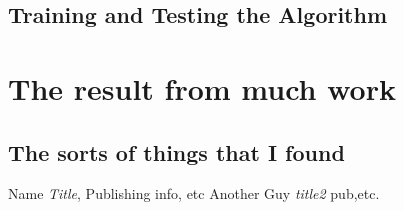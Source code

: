 \documentclass[a4paper,12pt]{report}
\begin{document}
\section{Training and Testing the Algorithm}











\chapter{The result from much work}
\section{The sorts of things that I found}













\begin{thebibliography}{9}
    Name \emph{Title},
    Publishing info, etc
    Another Guy \emph{title2}
    pub,etc.






\end{thebibliography}
\end{document}
